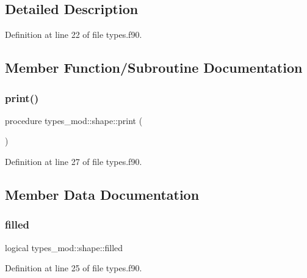 \subsection{Detailed Description}


Definition at line 22 of file types.\+f90.



\subsection{Member Function/\+Subroutine Documentation}
\mbox{\label{structtypes__mod_1_1shape_a5dcc9f8c35d773c39cf2dd037384372f}} 
\subsubsection{\texorpdfstring{print()}{print()}}
{\footnotesize\ttfamily procedure types\+\_\+mod\+::shape\+::print (\begin{DoxyParamCaption}{ }\end{DoxyParamCaption})\hspace{0.3cm}{\ttfamily [private]}}



Definition at line 27 of file types.\+f90.



\subsection{Member Data Documentation}
\mbox{\label{structtypes__mod_1_1shape_a555f9af7c5614d1009ccdf4400f98585}} 
\subsubsection{\texorpdfstring{filled}{filled}}
{\footnotesize\ttfamily logical types\+\_\+mod\+::shape\+::filled\hspace{0.3cm}{\ttfamily [private]}}



Definition at line 25 of file types.\+f90.

\mbox{\label{structtypes__mod_1_1shape_a7b42c10b99ecc401b25653f24943c874}} 
